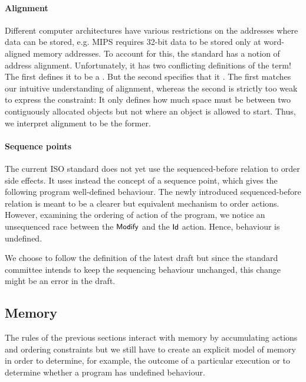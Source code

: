 \documentclass[a4paper,12pt]{scrbook}
\theoremstyle{plain}
\theoremstyle{definition}
\newcommand{\sem}[1]{{\small{\textsf{#1}}}}
\begin{document}
\paragraph{Alignment} Different computer architectures have various restrictions
on the addresses where data can be stored, e.g. MIPS requires 32-bit data to be
stored only at word-aligned memory addresses. To account for this, the standard
has a notion of address alignment. Unfortunately, it has two conflicting
definitions of the term! The first defines it to be a 
\cite[p. 3]{c1x}. But the second specifies that it  \cite[p. 48]{c1x}. The first matches
our intuitive understanding of alignment, whereas the second is strictly too
weak to express the constraint: It only defines how much space must be between
two contiguously allocated objects but not where an object is allowed to
start. Thus, we interpret alignment to be the former.
\paragraph{Sequence points} The current ISO standard does not yet use the
sequenced-before relation to order side effects. It uses instead the concept of
a sequence point, which gives the following program well-defined
behaviour.  The newly introduced
sequenced-before relation is meant to be a clearer but equivalent mechanism to
order actions. However, examining the ordering of action of the program, we
notice an unsequenced race between the $\sem{Modify}$ and the $\sem{Id}$
action. Hence, behaviour is undefined.
\begin{figure}[h]
\centering
\end{figure}
We choose to follow the definition of the latest draft but since the standard
committee intends to keep the sequencing behaviour unchanged, this change might
be an error in the draft.

\subsection{Memory}
The rules of the previous sections interact with memory by accumulating actions
and ordering constraints but we still have to create an explicit model of memory
in order to determine, for example, the outcome of a particular execution or to
determine whether a program has undefined behaviour.
\end{document}
